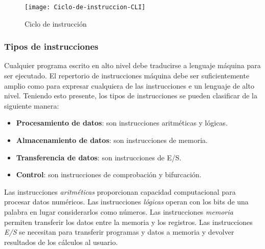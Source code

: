 \begin{subs}
  \begin{figure}[H]
    \centering
    \texttt{[image: Ciclo-de-instruccion-CLI]}
    \caption{Ciclo de instrucción}
  \end{figure}

  \subsubsection{Tipos de instrucciones}

  Cualquier programa escrito en alto nivel debe traducirse a lenguaje máquina para ser ejecutado. El repertorio de instrucciones máquina debe ser suficientemente amplio como para expresar cualquiera de las instrucciones e un lenguaje de alto nivel. Teniendo esto presente, los tipos de instrucciones se pueden clasificar de la siguiente manera:
  \begin{itemize}
    \item \textbf{Procesamiento de datos}: son instrucciones aritméticas y lógicas.
    \item \textbf{Almacenamiento de datos}: son instrucciones de memoria.
    \item \textbf{Transferencia de datos}: son instrucciones de E/S.
    \item \textbf{Control}: son instrucciones de comprobación y bifurcación.
  \end{itemize}

  Las instrucciones \textit{aritméticas} proporcionan capacidad computacional para procesar datos numéricos. Las instrucciones \textit{lógicas} operan con los bits de una palabra en lugar considerarlos como números. Las instrucciones \textit{memoria} permiten transferir los datos entre la memoria y los registros. Las instrucciones \textit{E/S} se necesitan para transferir programas y datos a memoria y devolver resultados de los cálculos al usuario. 
\end{subs}